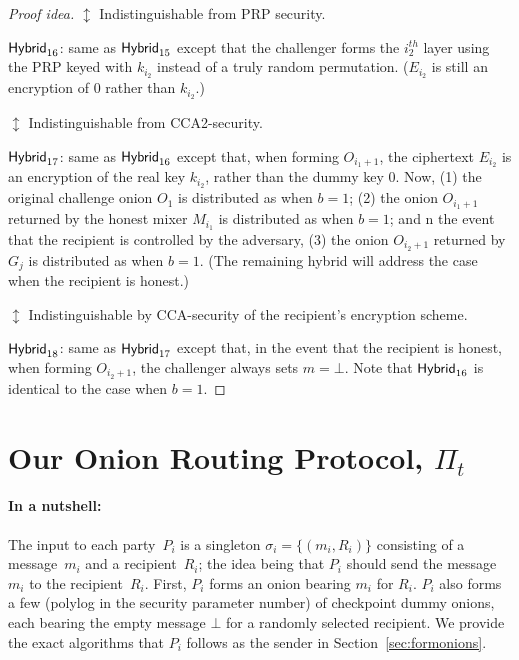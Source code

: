 \documentclass[runningheads,a4paper]{llncs}
\begin{document}
\begin{proof}[Proof idea]
    \textcolor{hybrid}{$\updownarrow$ Indistinguishable from PRP security.}

\noindent $\mathsf{Hybrid}_{16}$: same as $\mathsf{Hybrid}_{15}$ except that the challenger forms the $i_2^\mathit{th}$ layer using the PRP keyed with $k_{i_2}$ instead of a truly random permutation. ($E_{i_2}$ is still an encryption of $0$ rather than $k_{i_2}$.) 

    \textcolor{hybrid}{$\updownarrow$ Indistinguishable from CCA2-security.}

\noindent $\mathsf{Hybrid}_{17}$: same as $\mathsf{Hybrid}_{16}$ except that, when forming $O_{i_1+1}$, the ciphertext $E_{i_2}$ is an encryption of the real key $k_{i_2}$, rather than the dummy key $0$.  Now, (1) the original challenge onion $O_1$ is distributed as when $b=1$; (2) the onion $O_{i_1+1}$ returned by the honest mixer $M_{i_1}$ is distributed as when $b=1$; and n the event that the recipient is controlled by the adversary, (3) the onion $O_{i_2+1}$ returned by $G_{j}$ is distributed as when $b=1$. (The remaining hybrid will address the case when the recipient is honest.)

\textcolor{hybrid}{$\updownarrow$ Indistinguishable by CCA-security of the recipient's encryption scheme.}

\noindent $\mathsf{Hybrid}_{18}$: same as $\mathsf{Hybrid}_{17}$ except that, in the event that the recipient is honest, when forming $O_{i_2+1}$, the challenger always sets $m=\bot$.  Note that $\mathsf{Hybrid}_{16}$ is identical to the case when $b=1$.
\fi
\end{proof}

\newcommand{\protocol}{\Pi_t}
\section{Our Onion Routing Protocol, $\protocol$} \label{sec:dp} 

\iffalse 
\paragraph{In a nutshell:} The input to each party~$P_i$ is a singleton $\sigma_i = \{(m_i, R_i)\}$ consisting of a message~$m_i$ and a recipient~$R_i$; the idea being that $P_i$ should send the message~$m_i$ to the recipient~$R_i$. First, $P_i$ forms an onion bearing $m_i$ for $R_i$. $P_i$ also forms a few (polylog in the security parameter number) of checkpoint dummy onions, each bearing the empty message $\bot$ for a randomly selected recipient. 
We provide the exact algorithms that $P_i$ follows as the sender in Section~\ref{sec:formonions}. 
\end{document}

